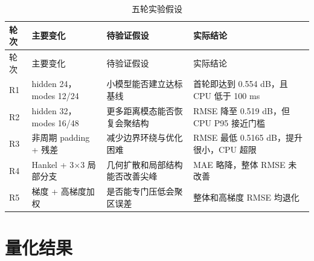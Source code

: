 \documentclass[UTF8,12pt,openany]{ctexrep}
\begin{document}
\begin{longtable}{L{1.2cm}L{3.5cm}L{4.3cm}L{5.2cm}}
\caption{五轮实验假设}\label{tab:ablation-hypothesis}\\
\toprule
轮次 & 主要变化 & 待验证假设 & 实际结论 \\
\midrule
\endfirsthead
\toprule
轮次 & 主要变化 & 待验证假设 & 实际结论 \\
\midrule
\endhead
R1 & hidden 24，modes 12/24 & 小模型能否建立达标基线 & 首轮即达到 0.554 dB，且 CPU 低于 100 ms \\
R2 & hidden 32，modes 16/48 & 更多距离模态能否恢复会聚结构 & RMSE 降至 0.519 dB，但 CPU P95 接近门槛 \\
R3 & 非周期 padding + 残差 & 减少边界环绕与优化困难 & RMSE 最低 0.5165 dB，提升很小，CPU 超限 \\
R4 & Hankel + 3$\times$3 局部分支 & 几何扩散和局部结构能否改善尖峰 & MAE 略降，整体 RMSE 未改善 \\
R5 & 梯度 + 高梯度加权 & 是否能专门压低会聚区误差 & 整体和高梯度 RMSE 均退化 \\
\bottomrule
\end{longtable}

\section{量化结果}

\begin{table}[H]
\centering
\caption{五轮测试精度与复杂度}
\end{table}
\end{document}
